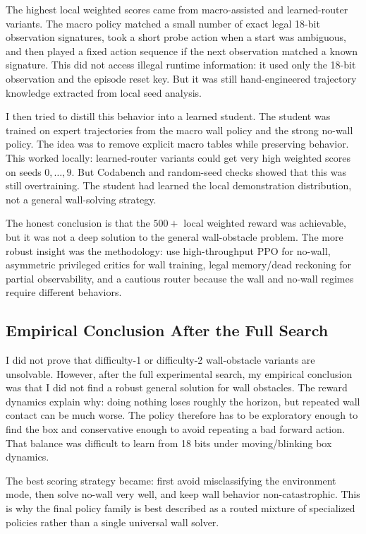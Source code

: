 \documentclass[11pt, oneside]{article}   	%
\begin{document}
The highest local weighted scores came from macro-assisted and learned-router variants.
The macro policy matched a small number of exact legal 18-bit observation signatures,
took a short probe action when a start was ambiguous, and then played a fixed action
sequence if the next observation matched a known signature. This did not access illegal
runtime information: it used only the 18-bit observation and the episode reset key. But
it was still hand-engineered trajectory knowledge extracted from local seed analysis.

I then tried to distill this behavior into a learned student. The student was trained on
expert trajectories from the macro wall policy and the strong no-wall policy. The idea
was to remove explicit macro tables while preserving behavior. This worked locally:
learned-router variants could get very high weighted scores on seeds \(0,\ldots,9\).
But Codabench and random-seed checks showed that this was still overtraining. The
student had learned the local demonstration distribution, not a general wall-solving
strategy.

The honest conclusion is that the \(500+\) local weighted reward was achievable, but it
was not a deep solution to the general wall-obstacle problem. The more robust insight was
the methodology: use high-throughput PPO for no-wall, asymmetric privileged critics for
wall training, legal memory/dead reckoning for partial observability, and a cautious
router because the wall and no-wall regimes require different behaviors.

\subsection{Empirical Conclusion After the Full Search}

I did not prove that difficulty-1 or difficulty-2 wall-obstacle variants are unsolvable.
However, after the full experimental search, my empirical conclusion was that I did not
find a robust general solution for wall obstacles. The reward dynamics explain why:
doing nothing loses roughly the horizon, but repeated wall contact can be much worse.
The policy therefore has to be exploratory enough to find the box and conservative
enough to avoid repeating a bad forward action. That balance was difficult to learn from
18 bits under moving/blinking box dynamics.

The best scoring strategy became: first avoid misclassifying the environment mode, then
solve no-wall very well, and keep wall behavior non-catastrophic. This is why the final
policy family is best described as a routed mixture of specialized policies rather than
a single universal wall solver.
\end{document}
